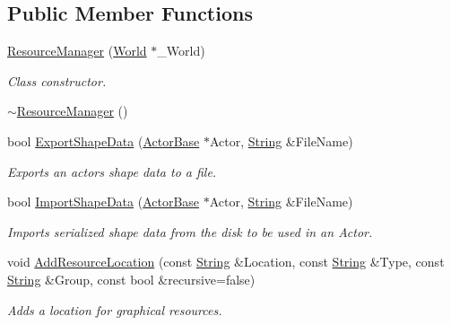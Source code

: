 \subsection*{Public Member Functions}
\begin{DoxyCompactItemize}
\item 
\hyperlink{classphys_1_1ResourceManager_aee07d73a8abc74398c3e0a1d62195fc9}{ResourceManager} (\hyperlink{classphys_1_1World}{World} $\ast$\_\-World)
\begin{DoxyCompactList}\small\item\em Class constructor. \item\end{DoxyCompactList}\item 
\hyperlink{classphys_1_1ResourceManager_a426d4d684a9ecf98359362243ce01072}{$\sim$ResourceManager} ()
\item 
bool \hyperlink{classphys_1_1ResourceManager_a3b3f3b97be1bcac74171a9fbfa90ebe7}{ExportShapeData} (\hyperlink{classphys_1_1ActorBase}{ActorBase} $\ast$Actor, \hyperlink{namespacephys_aa03900411993de7fbfec4789bc1d392e}{String} \&FileName)
\begin{DoxyCompactList}\small\item\em Exports an actors shape data to a file. \item\end{DoxyCompactList}\item 
bool \hyperlink{classphys_1_1ResourceManager_a98cee7034bdf66a5cca1de8ade33139d}{ImportShapeData} (\hyperlink{classphys_1_1ActorBase}{ActorBase} $\ast$Actor, \hyperlink{namespacephys_aa03900411993de7fbfec4789bc1d392e}{String} \&FileName)
\begin{DoxyCompactList}\small\item\em Imports serialized shape data from the disk to be used in an Actor. \item\end{DoxyCompactList}\item 
void \hyperlink{classphys_1_1ResourceManager_a0d7d3adce2ad4c70a3e867396e17b090}{AddResourceLocation} (const \hyperlink{namespacephys_aa03900411993de7fbfec4789bc1d392e}{String} \&Location, const \hyperlink{namespacephys_aa03900411993de7fbfec4789bc1d392e}{String} \&Type, const \hyperlink{namespacephys_aa03900411993de7fbfec4789bc1d392e}{String} \&Group, const bool \&recursive=false)
\begin{DoxyCompactList}\small\item\em Adds a location for graphical resources. \item\end{DoxyCompactList}\item 

\end{DoxyCompactItemize}
